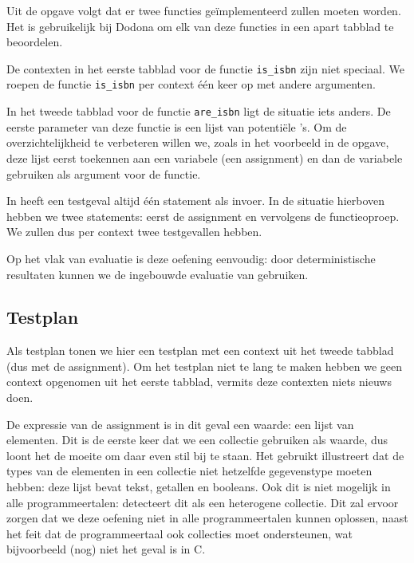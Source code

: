 Uit de opgave volgt dat er twee functies geïmplementeerd zullen moeten worden.
Het is gebruikelijk bij Dodona om elk van deze functies in een apart tabblad te beoordelen.

De contexten in het eerste tabblad voor de functie \texttt{is\_isbn} zijn niet speciaal.
We roepen de functie \texttt{is\_isbn} per context één keer op met andere argumenten.

In het tweede tabblad voor de functie \texttt{are\_isbn} ligt de situatie iets anders.
De eerste parameter van deze functie is een lijst van potentiële 's.
Om de overzichtelijkheid te verbeteren willen we, zoals in het voorbeeld in de opgave, deze lijst eerst toekennen aan een variabele (een assignment) en dan de variabele gebruiken als argument voor de functie.

In \tested{} heeft een testgeval altijd één statement als invoer.
In de situatie hierboven hebben we twee statements: eerst de assignment en vervolgens de functieoproep.
We zullen dus per context twee testgevallen hebben.

Op het vlak van evaluatie is deze oefening eenvoudig: door deterministische resultaten kunnen we de ingebouwde evaluatie van \tested{} gebruiken.

\subsection{Testplan}\label{subsec:oefening-isbn-testplan}

Als testplan tonen we hier een testplan met een context uit het tweede tabblad (dus met de assignment).
Om het testplan niet te lang te maken hebben we geen context opgenomen uit het eerste tabblad, vermits deze contexten niets nieuws doen.

De expressie van de assignment is in dit geval een waarde: een lijst van elementen.
Dit is de eerste keer dat we een collectie gebruiken als waarde, dus loont het de moeite om daar even stil bij te staan.
Het gebruikt illustreert dat de types van de elementen in een collectie niet hetzelfde gegevenstype moeten hebben: deze lijst bevat tekst, getallen en booleans.
Ook dit is niet mogelijk in alle programmeertalen: \tested{} detecteert dit als een heterogene collectie.
Dit zal ervoor zorgen dat we deze oefening niet in alle programmeertalen kunnen oplossen, naast het feit dat de programmeertaal ook collecties moet ondersteunen, wat bijvoorbeeld (nog) niet het geval is in C\@.

\inputminted{json}{sources/isbn-plan.tson}

